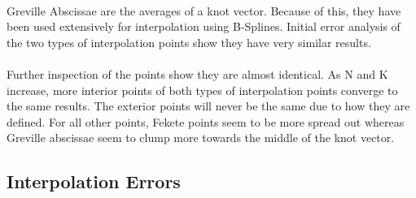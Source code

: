\documentclass{article}
\begin{document}
\paragraph{}
Greville Abscissae are the averages of a knot vector. Because of this, they have been used extensively for interpolation using B-Splines. Initial error analysis of the two types of interpolation points show they have very similar results.
\paragraph{}
Further inspection of the points show they are almost identical. As N and K increase, more interior points of both types of interpolation points converge to the same results. The exterior points will never be the same due to how they are defined. For all other points, Fekete points seem to be more spread out whereas Greville abscissae seem to clump more towards the middle of the knot vector.
\subsection*{Interpolation Errors}
\end{document}

